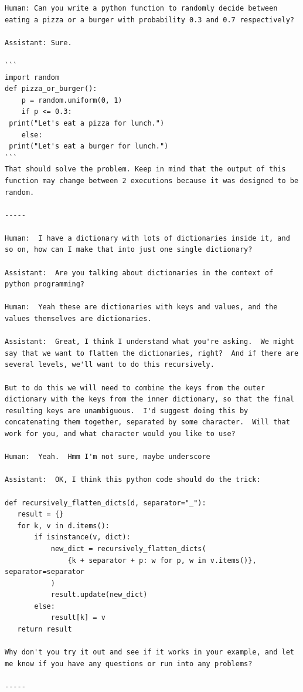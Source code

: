 \documentclass[10pt]{article} %
\begin{document}
\begin{lstlisting}
Human: Can you write a python function to randomly decide between eating a pizza or a burger with probability 0.3 and 0.7 respectively?

Assistant: Sure.

```
import random
def pizza_or_burger():
    p = random.uniform(0, 1)
    if p <= 0.3:
 print("Let's eat a pizza for lunch.")
    else:
 print("Let's eat a burger for lunch.")
```
That should solve the problem. Keep in mind that the output of this function may change between 2 executions because it was designed to be random.

-----

Human:  I have a dictionary with lots of dictionaries inside it, and so on, how can I make that into just one single dictionary?

Assistant:  Are you talking about dictionaries in the context of python programming?

Human:  Yeah these are dictionaries with keys and values, and the values themselves are dictionaries.

Assistant:  Great, I think I understand what you're asking.  We might say that we want to flatten the dictionaries, right?  And if there are several levels, we'll want to do this recursively.

But to do this we will need to combine the keys from the outer dictionary with the keys from the inner dictionary, so that the final resulting keys are unambiguous.  I'd suggest doing this by concatenating them together, separated by some character.  Will that work for you, and what character would you like to use?

Human:  Yeah.  Hmm I'm not sure, maybe underscore

Assistant:  OK, I think this python code should do the trick:

def recursively_flatten_dicts(d, separator="_"):
   result = {}
   for k, v in d.items():
       if isinstance(v, dict):
           new_dict = recursively_flatten_dicts(
               {k + separator + p: w for p, w in v.items()}, separator=separator
           )
           result.update(new_dict)
       else:
           result[k] = v
   return result

Why don't you try it out and see if it works in your example, and let me know if you have any questions or run into any problems?

-----
\end{lstlisting}
\end{document}
